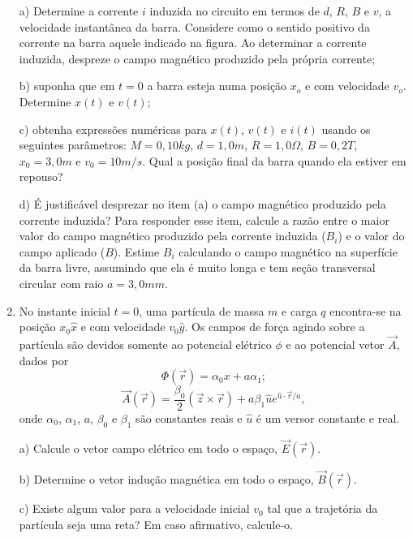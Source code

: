 \begin{enumerate}[start=1,label={\bfseries Q\arabic*.}]
a) Determine a corrente $i$ induzida no circuito em termos de $d$, $R$, $B$ e $v$, a velocidade instantânea da barra. Considere como o sentido positivo da corrente na barra aquele indicado na figura. Ao determinar a corrente induzida, despreze o campo magnético produzido pela própria corrente;

\resposta

b) suponha que em $t = 0$ a barra esteja numa posição $x_{o}$ e com velocidade $v_{o}$. Determine $x(t)$ e $v(t)$;

\resposta

c) obtenha expressões numéricas para $x(t)$, $v(t)$ e $i(t)$ usando os seguintes parâmetros: $M = 0,10 kg$, $d = 1,0  m$, $R = 1,0 \Omega$, $B = 0,2 T$, $x_{0} = 3,0 m$ e $v_{0} = 10 m/s$. Qual a posição final da barra quando ela estiver em repouso?

\resposta

d) É justificável desprezar no item (a) o campo magnético produzido pela corrente induzida? Para responder esse item, calcule a razão entre o maior valor do campo magnético produzido pela corrente induzida ($B_{i}$) e o valor do campo aplicado ($B$). Estime $B_{i}$ calculando o campo magnético na superfície da barra livre, assumindo que ela é muito longa e tem seção transversal circular com raio $a = 3,0 mm$.

\resposta


\item No instante inicial $t = 0$, uma partícula de massa $m$ e carga $q$ encontra-se na posição $x_{0} \hat{x}$ e com velocidade $v_{0} \hat{y}$. Os campos de força agindo sobre a partícula são devidos somente ao potencial elétrico $\phi$ e ao potencial vetor $\vec{A}$, dados por
$$ \Phi (\vec{r}) = \alpha_{0} x + a \alpha_{1} ; $$
$$ \vec{A} (\vec{r}) = \frac{\beta_{0}}{2} ( \vec{z} \times \vec{r} ) +  a \beta_{1} \hat{u} e^{\hat{u} \cdot \vec{r} / a} ,$$
onde $\alpha_{0}$, $\alpha_{1}$, $a$, $\beta_{0}$ e $\beta_{1}$ são constantes reais e $\hat{u}$ é um versor constante e real.

a) Calcule o vetor campo elétrico em todo o espaço, $\vec{E}(\vec{r})$.

\resposta

b) Determine o vetor indução magnética em todo o espaço, $\vec{B}(\vec{r})$.

\resposta

c) Existe algum valor para a velocidade inicial $v_{0}$ tal que a trajetória da partícula seja uma reta? Em caso afirmativo, calcule-o.


\end{enumerate}
